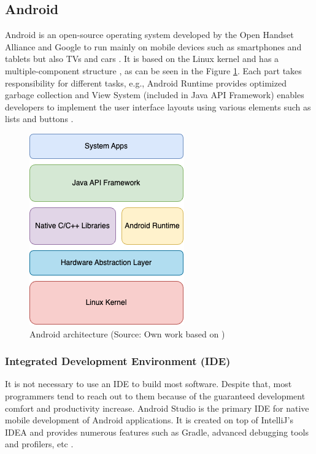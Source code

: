 \subsection{Android}

Android is an open-source operating system developed by the Open Handset Alliance and Google to run mainly on mobile devices such as smartphones and tablets but also TVs and cars \cite{android_what_is,comparison_technologies_multiplatform}. It is based on the Linux kernel and has a multiple-component structure \cite{android_architecture_and_application}, as can be seen in the Figure \ref{fig:android_architecture}. Each part takes responsibility for different tasks, e.g., Android Runtime provides optimized garbage collection and View System (included in Java API Framework) enables developers to implement the user interface layouts using various elements such as lists and buttons \cite{android_architecture}.

\begin{figure}[h]
    \centering
    \includegraphics[scale=0.73]{img/android_architecture}
    \caption{Android architecture (Source: Own work based on \cite{android_architecture})}
    \label{fig:android_architecture}
\end{figure}

\subsubsection*{Integrated Development Environment (IDE)}

It is not necessary to use an IDE to build most software. Despite that, most programmers tend to reach out to them because of the guaranteed development comfort and productivity increase. Android Studio is the primary IDE for native mobile development of Android applications. It is created on top of IntelliJ's IDEA and provides numerous features such as Gradle, advanced debugging tools and profilers, etc \cite{android_studio_intro}.

